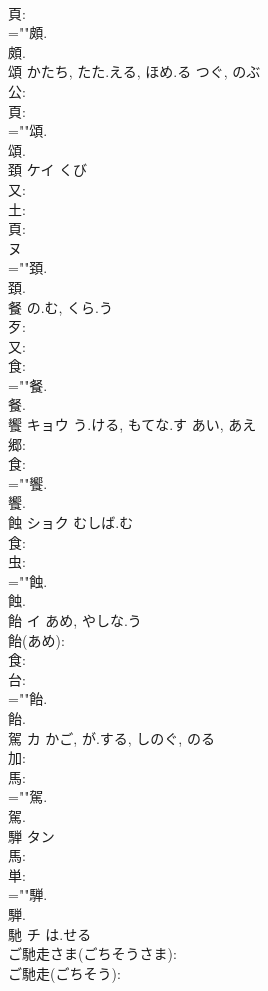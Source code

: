 \documentclass[8pt]{extreport}
\begin{document}
\begin{CJK}{UTF8}{min}
\\	頁: 
\\	=""頗.
\\	頗.
\\	頌		かたち, たた.える, ほめ.る	つぐ, のぶ			
\\	公: 
\\	頁: 
\\	=""頌.
\\	頌.
\\	頚	ケイ	くび		
\\	又: 
\\	土: 
\\	頁: 
\\	ヌ
\\	=""頚.
\\	頚.
\\	餐		の.む, くら.う				
\\	歹: 
\\	又: 
\\	食: 
\\	=""餐.
\\	餐.
\\	饗	キョウ	う.ける, もてな.す	あい, あえ	
\\	郷: 
\\	食: 
\\	=""饗.
\\	饗.
\\	蝕	ショク	むしば.む		
\\	食: 
\\	虫: 
\\	=""蝕.
\\	蝕.
\\	飴	イ	あめ, やしな.う		
\\	飴(あめ): 
\\	食: 
\\	台: 
\\	=""飴.
\\	飴.
\\	駕	カ	かご, が.する, しのぐ, のる		
\\	加: 
\\	馬: 
\\	=""駕.
\\	駕.
\\	騨	タン			
\\	馬: 
\\	単: 
\\	=""騨.
\\	騨.
\\	馳	チ	は.せる		
\\	ご馳走さま(ごちそうさま): 
\\	ご馳走(ごちそう): 

\end{CJK}
\end{document}

